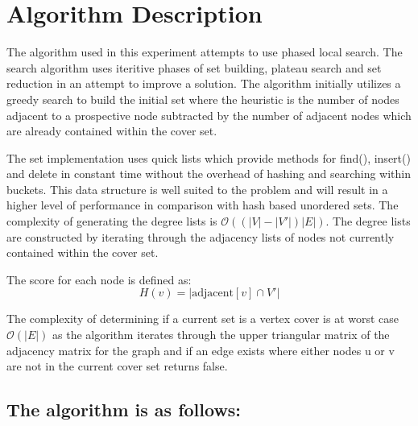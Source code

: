 \documentclass[conference,letterpaper]{IEEEtran}
\begin{document}
\section{Algorithm Description}
\par The algorithm used in this experiment attempts to use phased local search. The search algorithm uses iteritive phases of set building, plateau search and set reduction in an attempt to improve a solution. The algorithm initially utilizes a greedy search to build the initial set where the heuristic is the number of nodes adjacent to a prospective node subtracted by the number of adjacent nodes which are already contained within the cover set.
\par The set implementation uses quick lists which provide methods for find(), insert() and delete in constant time without the overhead of hashing and searching within buckets. This data structure is well suited to the problem and will result in a higher level of performance in comparison with hash based unordered sets. The complexity of generating the degree lists is $\mathcal{O}((|V| - |V\prime|)|E|)$. The degree lists are constructed by iterating through the adjacency lists of nodes not currently contained within the cover set. 
\par The score for each node is defined as:
\begin{equation}
    H(v)=|\mbox{adjacent}[v] \cap V\prime|
\end{equation}
\par The complexity of determining if a current set is a vertex cover is at worst case $\mathcal{O}(|E|)$ as the algorithm iterates through the upper triangular matrix of the adjacency matrix for the graph and if an edge exists where either nodes u or v are not in the current cover set returns false.

\subsection{The algorithm is as follows:}

\end{document}
